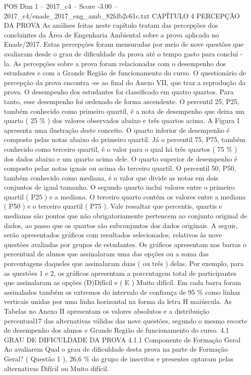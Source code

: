 \begin{textsample}{POS Dim 1 – 2017\_c4 – Score -3.00 – 2017\_c4/enade\_2017\_eng\_amb\_82fdb2c61c.txt}  \label{ex:f1_pos_278}
CAPÍTULO 4 PERCEPÇÃO DA PROVA As análises feitas neste capítulo tratam das percepções dos concluintes da Área de Engenharia Ambiental sobre a prova aplicada no Enade/2017.
Estas percepções foram mensuradas por meio de nove questões que avaliaram desde o grau de dificuldade da prova até o tempo gasto para concluí -la.
As percepções sobre a prova foram relacionadas com o desempenho dos estudantes e com a Grande Região de funcionamento do curso.
O questionário de percepção da prova encontra -se ao final do Anexo VII, que traz a reprodução da prova.
O desempenho dos estudantes foi classificado em quatro quartos.
Para tanto, esse desempenho foi ordenado de forma ascendente.
O percentil 25, P25, também conhecido como primeiro quartil, é a nota de desempenho que deixa um quarto ( 25 \% ) dos valores observados abaixo e três quartos acima.
A Figura 1 apresenta uma ilustração deste conceito.
O quarto inferior de desempenho é composto pelas notas abaixo do primeiro quartil.
Já o percentil 75, P75, também conhecido como terceiro quartil, é o valor para o qual há três quartos ( 75 \% ) dos dados abaixo e um quarto acima dele.
O quarto superior de desempenho é composto pelas notas iguais ou acima do terceiro quartil.
O percentil 50, P50, também conhecido como mediana, é o valor que divide as notas em dois conjuntos de igual tamanho.
O segundo quarto inclui valores entre o primeiro quartil ( P25 ) e a mediana.
O terceiro quarto contém os valores entre a mediana ( P50 ) e o terceiro quartil ( P75 ).
Vale ressaltar que percentis, quartis e medianas são pontos que não obrigatoriamente pertencem ao conjunto original de dados, ao passo que os quartos são subconjuntos dos dados originais.
A seguir, serão apresentados gráficos com resultados selecionados, relativos às nove questões avaliadas por grupos de estudantes.
Os gráficos apresentam nas barras o percentual de alunos que assinalaram uma das opções ou a soma das porcentagens daqueles que assinalaram duas ( ou três ) delas.
Por exemplo, para as questões 1 e 2, os gráficos apresentam a porcentagem total de participantes que assinalaram as opções (D)Difícil e ( E ) Muito difícil.
Em cada barra foram assinalados também os extremos do intervalo de confiança de 95 \% como linhas verticais unidas por uma linha horizontal na forma da letra H maiúscula.
As Tabelas no Anexo II apresentam os valores absolutos e a distribuição percentual17 das alternativas válidas das nove questões, segundo o mesmo recorte de desempenho dos alunos e Grande Região de funcionamento do curso. 4.1 GRAU DE DIFICULDADE DA PROVA 4.1.1 Componente de Formação Geral Ao avaliarem Qual o grau de dificuldade desta prova na parte de Formação Geral? ( Questão 1 ), 26,6 \% do grupo de inscritos e presentes optaram pelas alternativas Difícil ou Muito difícil.

\end{textsample}
